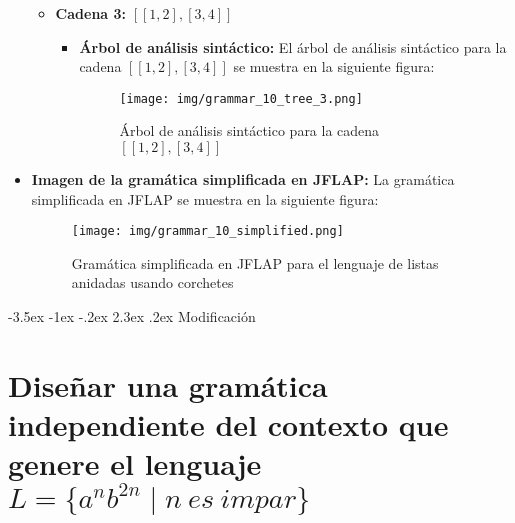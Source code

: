 \documentclass[11pt]{report}
\makeatletter
\renewcommand\chapter{\@startsection{chapter}{0}{\z@}%
    {-3.5ex \@plus -1ex \@minus -.2ex}%
    {2.3ex \@plus.2ex}%
    {\normalfont\Large\bfseries}}
\makeatother
\begin{document}
\begin{itemize}
\begin{itemize}
    \newpage

    \item \textbf{Cadena 3:} $[[1,2],[3,4]]$
    \begin{itemize}
      \item \textbf{Árbol de análisis sintáctico:} El árbol de análisis sintáctico para la cadena $[[1,2],[3,4]]$ se muestra en la siguiente figura:
      \begin{figure}[H]
        \centering
        \texttt{[image: img/grammar\_10\_tree\_3.png]}
        \caption{Árbol de análisis sintáctico para la cadena $[[1,2],[3,4]]$}
        \label{fig:arbol30}
      \end{figure}
    \end{itemize}
  \end{itemize}

  \newpage

  \item \textbf{Imagen de la gramática simplificada en JFLAP:} La gramática simplificada en JFLAP se muestra en la siguiente figura:
  \begin{figure}[H]
    \centering
    \texttt{[image: img/grammar\_10\_simplified.png]}
    \caption{Gramática simplificada en JFLAP para el lenguaje de listas anidadas usando corchetes}
    \label{fig:gramatica10_simplified}
  \end{figure}
\end{itemize}

\newpage

\chapter{Modificación}
\section{Diseñar una gramática independiente del contexto que genere el lenguaje $L = \{a^n b^{2n} \mid n \ es \ impar\}$}
\end{document}
